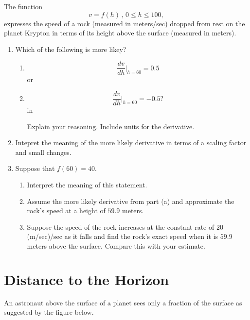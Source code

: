 \documentclass{ximera}
\newcommand{\pskip}{\vskip 0.1 in}
\begin{document}
\begin{example} \label{Ex8df8334df}
The function
\[
   v= f(h) \, , \, 0\leq h \leq 100 ,
\]
expresses the speed of a rock (measured in meters/sec) dropped from rest on the planet Krypton in terms of its height above the surface (measured in meters).

\begin{enumerate}
\item Which of the following is more likey?

\begin{enumerate}
\item 
\[
  \frac{dv}{dh}\Big|_{h=60} = 0.5
\]
or 
\item 
\[
  \frac{dv}{dh}\Big|_{h=60} = -0.5 ?
\]
\pskip

Explain your reasoning. Include units for the derivative.

\end{enumerate}

\item Intepret the meaning of the more likely derivative in terms of a scaling factor and small changes.

\item Suppose that $f(60) = 40$.

\begin{enumerate}
\item Interpret the meaning of this statement.

\item Assume the more likely derivative from part (a) and approximate the rock's speed at a height of $59.9$ meters.

\item Suppose the speed of the rock increases at the constant rate of $20$ (m/sec)/sec as it falls and find the rock's exact speed when it is $59.9$ meters above the surface. Compare this with your estimate.
\end{enumerate}

\end{enumerate}
\end{example}


\section{Distance to the Horizon}
An astronaut above the surface of a planet sees only a fraction of the surface as suggested by the figure below.

\begin{onlineOnly}
    \begin{center}
\end{center}
\end{onlineOnly}
\end{document}
